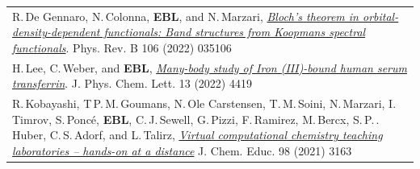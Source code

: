 \documentclass[10pt,a4paper,final]{article}
\begin{document}
\begin{tabularx}{\textwidth}{
   X}
   \footnotesize R.\,De Gennaro, N.\,Colonna, \textbf{EBL}, and N.\,Marzari, \href{https://doi.org/10.1103/PhysRevB.106.035106}{\textit{Bloch's theorem in orbital-density-dependent functionals: Band structures from Koopmans spectral functionals}}. Phys. Rev. B 106 (2022) 035106                                                                                                                                                                                                                                                                                                                                                                                                                                                                                                     \\ %
   \footnotesize H.\,Lee, C.\,Weber, and \textbf{EBL}, \href{https://doi.org/10.1021/acs.jpclett.2c00680}{\textit{Many-body study of Iron (III)-bound human serum transferrin}}. J. Phys. Chem. Lett. 13 (2022) 4419                                                                                                                                                                                                                                                                                                                                                                                                                                                                                                                                                                      \\ %
   \footnotesize R.\,Kobayashi, T\,P.\,M.\,Goumans, N.\,Ole Carstensen, T.\,M.\,Soini, N.\,Marzari, I.\,Timrov, S.\,Ponc\'e, \textbf{EBL}, C.\,J.\,Sewell, G.\,Pizzi, F.\,Ramirez, M.\,Bercx, S.\,P.\,. Huber, C.\,S.\,Adorf, and L.\,Talirz, \href{https://doi.org/10.1021/acs.jchemed.1c00655}{\textit{Virtual computational chemistry teaching laboratories – hands-on at a distance}} J. Chem. Educ. 98 (2021) 3163                                                                                                                                                                                                                                                                                                                                                                  \\ %

\end{tabularx}
\end{document}
